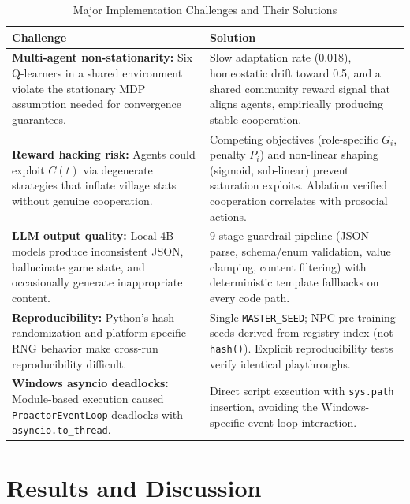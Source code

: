 \documentclass[12pt, a4paper, oneside]{report}
\begin{document}
\begin{table}[H]
\centering
\caption{Major Implementation Challenges and Their Solutions}
\label{tab:challenges}
\begin{tabularx}{\textwidth}{|X|X|}
\hline
\textbf{Challenge} & \textbf{Solution} \\
\hline
\textbf{Multi-agent non-stationarity:} Six Q-learners in a shared environment violate the stationary MDP assumption needed for convergence guarantees.
& Slow adaptation rate (0.018), homeostatic drift toward 0.5, and a shared community reward signal that aligns agents, empirically producing stable cooperation. \\
\hline
\textbf{Reward hacking risk:} Agents could exploit $C(t)$ via degenerate strategies that inflate village stats without genuine cooperation.
& Competing objectives (role-specific $G_i$, penalty $P_i$) and non-linear shaping (sigmoid, sub-linear) prevent saturation exploits. Ablation verified cooperation correlates with prosocial actions. \\
\hline
\textbf{LLM output quality:} Local 4B models produce inconsistent JSON, hallucinate game state, and occasionally generate inappropriate content.
& 9-stage guardrail pipeline (JSON parse, schema/enum validation, value clamping, content filtering) with deterministic template fallbacks on every code path. \\
\hline
\textbf{Reproducibility:} Python's hash randomization and platform-specific RNG behavior make cross-run reproducibility difficult.
& Single \texttt{MASTER\_SEED}; NPC pre-training seeds derived from registry index (not \texttt{hash()}). Explicit reproducibility tests verify identical playthroughs. \\
\hline
\textbf{Windows asyncio deadlocks:} Module-based execution caused \texttt{ProactorEventLoop} deadlocks with \texttt{asyncio.to\_thread}.
& Direct script execution with \texttt{sys.path} insertion, avoiding the Windows-specific event loop interaction. \\
\hline
\end{tabularx}
\end{table}

\chapter{Results and Discussion}
\label{chap:results}
\end{document}
